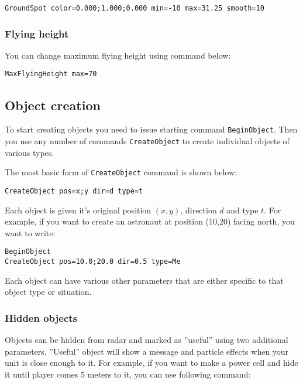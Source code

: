\begin{verbatim}
GroundSpot color=0.000;1.000;0.000 min=-10 max=31.25 smooth=10
\end{verbatim}


\subsubsection{Flying height}

You can change maximum flying height using command below:

\begin{verbatim}
MaxFlyingHeight max=70
\end{verbatim}


\subsection{Object creation}

To start creating objects you need to issue starting command \texttt{BeginObject}. Then you use any number of commands \texttt{CreateObject} to create individual objects of various types.

The most basic form of \texttt{CreateObject} command is shown below:

\begin{verbatim}
CreateObject pos=x;y dir=d type=t
\end{verbatim}

Each object is given it's original position $(x, y)$, direction $d$ and type $t$. For example, if you want to create an astronaut at position (10,20) facing north, you want to write:

\begin{verbatim}
BeginObject
CreateObject pos=10.0;20.0 dir=0.5 type=Me
\end{verbatim}

Each object can have various other parameters that are either specific to that object type or situation.


\subsubsection{Hidden objects}

Objects can be hidden from radar and marked as ''useful'' using two additional parameters. ''Useful'' object will show a message and particle effects when your unit is close enough to it. For example, if you want to make a power cell and hide it until player comes 5 meters to it, you can use following command:

